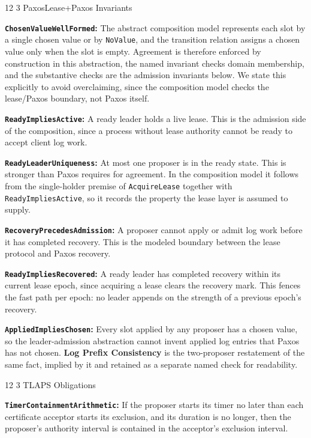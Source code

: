 \documentclass[final,5p,times,twocolumn,number]{elsarticle}
\makeatletter
\newcommand{\code}[1]{\texttt{#1}}
\newcommand{\invitem}[1]{\smallskip\noindent\textbf{#1:} }
\renewcommand\subsection{\@startsection{subsection}{2}{\z@}%
           {12\p@ \@plus 6\p@ \@minus 3\p@}%
           {3\p@ \@plus 6\p@ \@minus 3\p@}%
           {\normalfont\normalsize\bfseries}}
\makeatother
\begin{document}
\subsection{PaxosLease+Paxos Invariants}

\invitem{\code{ChosenValueWellFormed}}The abstract composition model represents each slot by a single chosen value or by \code{NoValue}, and the transition relation assigns a chosen value only when the slot is empty.  Agreement is therefore enforced by construction in this abstraction, the named invariant checks domain membership, and the substantive checks are the admission invariants below.  We state this explicitly to avoid overclaiming, since the composition model checks the lease/Paxos boundary, not Paxos itself.

\invitem{\code{ReadyImpliesActive}}A ready leader holds a live lease.  This is the admission side of the composition, since a process without lease authority cannot be ready to accept client log work.

\invitem{\code{ReadyLeaderUniqueness}}At most one proposer is in the ready state.  This is stronger than Paxos requires for agreement.  In the composition model it follows from the single-holder premise of \code{AcquireLease} together with \code{ReadyImpliesActive}, so it records the property the lease layer is assumed to supply.

\invitem{\code{RecoveryPrecedesAdmission}}A proposer cannot apply or admit log work before it has completed recovery.  This is the modeled boundary between the lease protocol and Paxos recovery.

\invitem{\code{ReadyImpliesRecovered}}A ready leader has completed recovery within its current lease epoch, since acquiring a lease clears the recovery mark.  This fences the fast path per epoch: no leader appends on the strength of a previous epoch's recovery.

\invitem{\code{AppliedImpliesChosen}}Every slot applied by any proposer has a chosen value, so the leader-admission abstraction cannot invent applied log entries that Paxos has not chosen.  \textbf{Log Prefix Consistency} is the two-proposer restatement of the same fact, implied by it and retained as a separate named check for readability.

\subsection{TLAPS Obligations}

\invitem{\code{TimerContainmentArithmetic}}If the proposer starts its timer no later than each certificate acceptor starts its exclusion, and its duration is no longer, then the proposer's authority interval is contained in the acceptor's exclusion interval.
\end{document}
